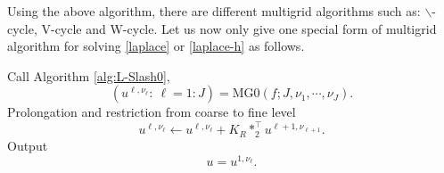 Using the above algorithm, there are different multigrid algorithms such as: $\backslash$-cycle, V-cycle and W-cycle.
Let us now only give one special form of multigrid algorithm for solving \eqref{laplace} or \eqref{laplace-h} as follows.
\begin{breakablealgorithm}%
	\caption{$u = {\backslash\text{-MG}}(f; J,\nu_1, \cdots, \nu_J)$}
	\label{alg:L-Slash1}
	\begin{algorithmic}
		\State Call Algorithm \ref{alg:L-Slash0},
		$$
		(u^{\ell,\nu_\ell}: ~\ell = 1:J) = {\text{MG0}}(f; J,\nu_1, \cdots, \nu_J).
		$$
		\State Prolongation and restriction from coarse to fine level
		\State
		$$
		u^{\ell,\nu_\ell} \leftarrow u^{\ell,\nu_\ell} + K_R  \ast_2^{\top} u^{\ell+1, \nu_{\ell+1}}.
		$$
		\EndFor
		\State Output
		$$
		u = u^{1,\nu_\ell}.
		$$
	\end{algorithmic}
\end{breakablealgorithm}

